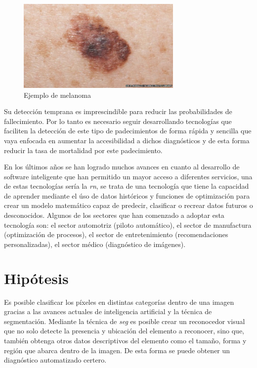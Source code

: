 \begin{figure}[h!]
    \includegraphics[width=80mm, scale = 0.8]{Figuras/skin_cancer_bbc.jpg}
    \centering
    \caption{Ejemplo de melanoma \citep{cancer_img_1}}
    \label{fig:can_jpg}
\end{figure}
 Su detección temprana es imprescindible para reducir las probabilidades de fallecimiento. Por lo tanto es necesario seguir desarrollando tecnologías que faciliten la detección de este tipo de padecimientos de forma rápida y sencilla que vaya enfocada en aumentar la accesibilidad a dichos diagnósticos y de esta forma reducir la tasa de mortalidad por este padecimiento.

En los últimos años se han logrado muchos avances en cuanto al desarrollo de software inteligente que han permitido un mayor acceso a diferentes servicios, una de estas tecnologías sería la \emph{\gls{rn}}, se trata de una tecnología que tiene la capacidad de aprender mediante el úso de datos históricos y funciones de optimización para crear un modelo matemático capaz de predecir, clasificar o recrear datos futuros o desconocidos. Algunos de los sectores que han comenzado a adoptar esta tecnología son: el sector automotriz (piloto automático), el sector de manufactura (optimización de procesos), el sector de entretenimiento (recomendaciones personalizadas), el sector médico (diagnóstico de imágenes). 


\section{Hipótesis}
Es posible clasificar los píxeles en distintas categorías dentro de una imagen gracias a las avances actuales de inteligencia artificial y la técnica de segmentación. Mediante la técnica de \emph{\gls{seg}} es posible crear un reconocedor visual que no solo detecte la presencia y ubicación del elemento a reconocer, sino que, también obtenga otros datos descriptivos del elemento como el tamaño, forma y región que abarca dentro de la imagen. De esta forma se puede obtener un diagnóstico automatizado certero.
